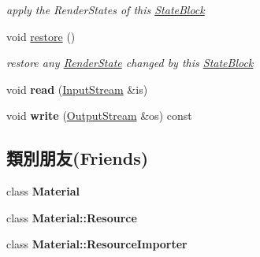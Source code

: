 \begin{DoxyCompactItemize}
\begin{DoxyCompactList}\small\item\em apply the Render\+States of this \hyperlink{class_i_dream_sky_1_1_material_1_1_state_block}{State\+Block} \end{DoxyCompactList}\item 
void \hyperlink{class_i_dream_sky_1_1_material_1_1_render_state_a7aaf6f2d8d296c69eaa73c8ef72bfb7f}{restore} ()\hypertarget{class_i_dream_sky_1_1_material_1_1_render_state_a7aaf6f2d8d296c69eaa73c8ef72bfb7f}{}\label{class_i_dream_sky_1_1_material_1_1_render_state_a7aaf6f2d8d296c69eaa73c8ef72bfb7f}

\begin{DoxyCompactList}\small\item\em restore any \hyperlink{class_i_dream_sky_1_1_material_1_1_render_state}{Render\+State} changed by this \hyperlink{class_i_dream_sky_1_1_material_1_1_state_block}{State\+Block} \end{DoxyCompactList}\item 
void {\bfseries read} (\hyperlink{class_i_dream_sky_1_1_input_stream}{Input\+Stream} \&is)\hypertarget{class_i_dream_sky_1_1_material_1_1_render_state_aea86ba4a6d0e25624cd0c9e4847ab991}{}\label{class_i_dream_sky_1_1_material_1_1_render_state_aea86ba4a6d0e25624cd0c9e4847ab991}

\item 
void {\bfseries write} (\hyperlink{class_i_dream_sky_1_1_output_stream}{Output\+Stream} \&os) const \hypertarget{class_i_dream_sky_1_1_material_1_1_render_state_a8d4f4e38f240d0445a76c8d01c8a6d87}{}\label{class_i_dream_sky_1_1_material_1_1_render_state_a8d4f4e38f240d0445a76c8d01c8a6d87}

\end{DoxyCompactItemize}
\subsection*{類別朋友(Friends)}
\begin{DoxyCompactItemize}
\item 
class {\bfseries Material}\hypertarget{class_i_dream_sky_1_1_material_1_1_render_state_aa1212b6e372a0f45d2c01f3cd203af77}{}\label{class_i_dream_sky_1_1_material_1_1_render_state_aa1212b6e372a0f45d2c01f3cd203af77}

\item 
class {\bfseries Material\+::\+Resource}\hypertarget{class_i_dream_sky_1_1_material_1_1_render_state_a6a002bcee6c883089769545352e9ccbd}{}\label{class_i_dream_sky_1_1_material_1_1_render_state_a6a002bcee6c883089769545352e9ccbd}

\item 
class {\bfseries Material\+::\+Resource\+Importer}\hypertarget{class_i_dream_sky_1_1_material_1_1_render_state_a941a71e735085112a8496c27836506ee}{}\label{class_i_dream_sky_1_1_material_1_1_render_state_a941a71e735085112a8496c27836506ee}

\end{DoxyCompactItemize}


